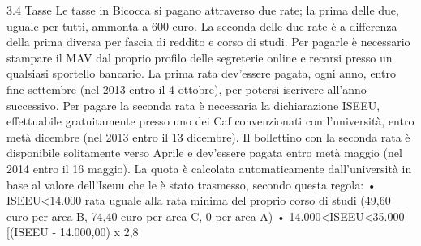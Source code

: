3.4 Tasse
Le tasse in Bicocca si pagano attraverso due rate; la prima delle due, uguale per tutti, ammonta a 600 euro. La seconda delle due rate è a differenza della prima diversa per fascia di reddito e corso di studi.
Per pagarle è necessario stampare il MAV dal proprio profilo delle segreterie online e recarsi presso un qualsiasi sportello bancario. La prima rata dev'essere pagata, ogni anno, entro fine settembre (nel 2013 entro il 4 ottobre), per potersi iscrivere all'anno successivo. Per pagare la seconda rata è necessaria la dichiarazione ISEEU, effettuabile gratuitamente presso uno dei Caf convenzionati con l'università, entro metà dicembre (nel 2013 entro il 13 dicembre). 
Il bollettino con la seconda rata è disponibile solitamente verso Aprile e dev'essere pagata entro metà maggio (nel 2014 entro il 16 maggio). La quota è calcolata automaticamente dall'università in base al valore dell'Iseuu che le è stato trasmesso, secondo questa regola: 
       • ISEEU<14.000 rata uguale alla rata minima del proprio corso di studi (49,60 euro per area B, 74,40 euro per area C, 0 per area A) 
       • 14.000<ISEEU<35.000 [(ISEEU - 14.000,00) x 2,8%
